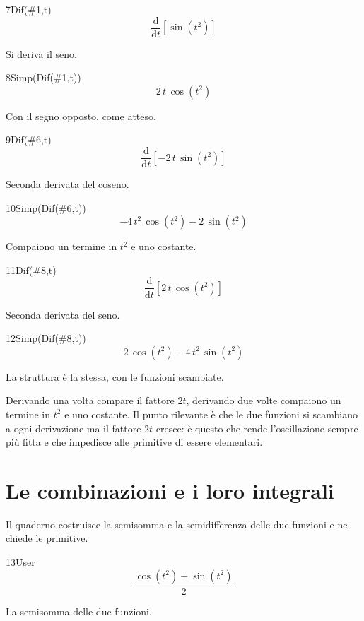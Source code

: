 \begin{espr}{7}{Dif(\#1,t)}{}
\[
\frac{\mathrm{d}}{\mathrm{d}t}\!\left[\sin\!\left(t^{2}\right)\right]
\]
\end{espr}
Si deriva il seno.

\begin{espr}{8}{Simp(Dif(\#1,t))}{}
\[
2\, t\, \cos\!\left(t^{2}\right)
\]
\end{espr}
Con il segno opposto, come atteso.

\begin{espr}{9}{Dif(\#6,t)}{}
\[
\frac{\mathrm{d}}{\mathrm{d}t}\!\left[-2\, t\, \sin\!\left(t^{2}\right)\right]
\]
\end{espr}
Seconda derivata del coseno.

\begin{espr}{10}{Simp(Dif(\#6,t))}{}
\[
-4\, t^{2}\, \cos\!\left(t^{2}\right) - 2\, \sin\!\left(t^{2}\right)
\]
\end{espr}
Compaiono un termine in $t^2$ e uno costante.

\begin{espr}{11}{Dif(\#8,t)}{}
\[
\frac{\mathrm{d}}{\mathrm{d}t}\!\left[2\, t\, \cos\!\left(t^{2}\right)\right]
\]
\end{espr}
Seconda derivata del seno.

\begin{espr}{12}{Simp(Dif(\#8,t))}{}
\[
2\, \cos\!\left(t^{2}\right) - 4\, t^{2}\, \sin\!\left(t^{2}\right)
\]
\end{espr}
La struttura è la stessa, con le funzioni scambiate.


Derivando una volta compare il fattore $2t$, derivando due volte compaiono un termine in $t^2$ e uno costante. Il punto rilevante è che le due funzioni si scambiano a ogni derivazione ma il fattore $2t$ cresce: è questo che rende l'oscillazione sempre più fitta e che impedisce alle primitive di essere elementari.

\section{Le combinazioni e i loro integrali}

Il quaderno costruisce la semisomma e la semidifferenza delle due funzioni e ne chiede le primitive.

\begin{espr}{13}{User}{}
\[
\frac{\cos\!\left(t^{2}\right) + \sin\!\left(t^{2}\right)}{2}
\]
\end{espr}
La semisomma delle due funzioni.

